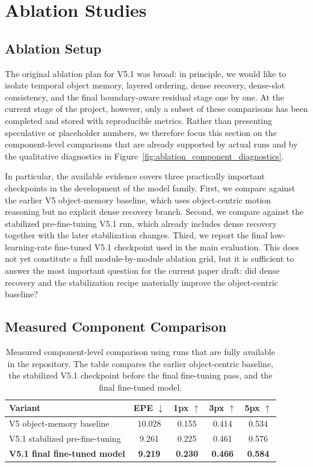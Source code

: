 \section{Ablation Studies}
\label{sec:ablation}

\subsection{Ablation Setup}

The original ablation plan for V5.1 was broad: in principle, we would like to isolate temporal object memory, layered ordering, dense recovery, dense-slot consistency, and the final boundary-aware residual stage one by one. At the current stage of the project, however, only a subset of these comparisons has been completed and stored with reproducible metrics. Rather than presenting speculative or placeholder numbers, we therefore focus this section on the component-level comparisons that are already supported by actual runs and by the qualitative diagnostics in Figure~\ref{fig:ablation_component_diagnostics}.

In particular, the available evidence covers three practically important checkpoints in the development of the model family. First, we compare against the earlier V5 object-memory baseline, which uses object-centric motion reasoning but no explicit dense recovery branch. Second, we compare against the stabilized pre-fine-tuning V5.1 run, which already includes dense recovery together with the later stabilization changes. Third, we report the final low-learning-rate fine-tuned V5.1 checkpoint used in the main evaluation. This does not yet constitute a full module-by-module ablation grid, but it is sufficient to answer the most important question for the current paper draft: did dense recovery and the stabilization recipe materially improve the object-centric baseline?

\subsection{Measured Component Comparison}

\begin{table}[t]
\centering
\caption{Measured component-level comparison using runs that are fully available in the repository. The table compares the earlier object-centric baseline, the stabilized V5.1 checkpoint before the final fine-tuning pass, and the final fine-tuned model.}
\label{tab:ablation_results}
\begin{tabular}{lcccc}
\hline
Variant & EPE $\downarrow$ & 1px $\uparrow$ & 3px $\uparrow$ & 5px $\uparrow$ \\
\hline
V5 object-memory baseline & 10.028 & 0.155 & 0.414 & 0.534 \\
V5.1 stabilized pre-fine-tuning & 9.261 & 0.225 & 0.461 & 0.576 \\
\textbf{V5.1 final fine-tuned model} & \textbf{9.219} & \textbf{0.230} & \textbf{0.466} & \textbf{0.584} \\
\hline
\end{tabular}
\end{table}

